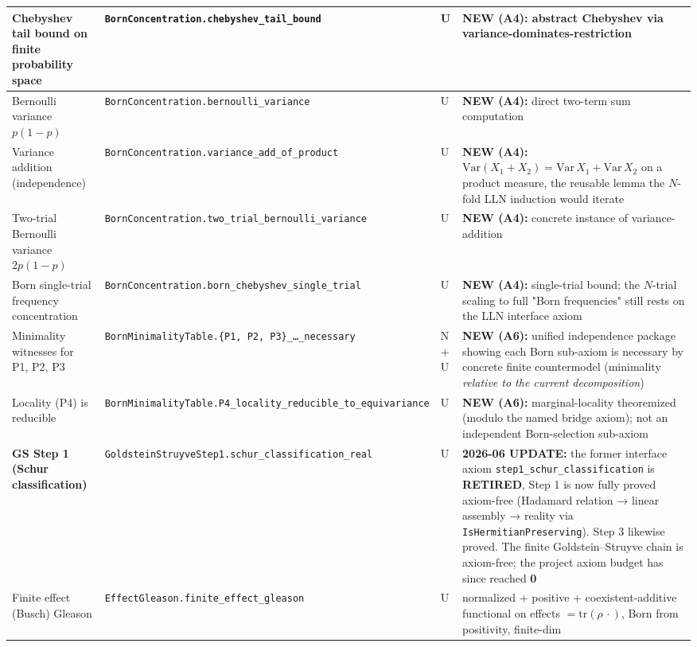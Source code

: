 \documentclass[11pt,a4paper]{article}
\begin{document}
\begin{center}
\begin{tabularx}{\linewidth}{|Y|Y|Y|Y|}
\hline
Chebyshev tail bound on finite probability space & \texttt{BornConcentration.chebyshev\_tail\_bound} & U & \textbf{NEW (A4):} abstract Chebyshev via variance-dominates-restriction \\
\hline
Bernoulli variance $p(1-p)$ & \texttt{BornConcentration.bernoulli\_variance} & U & \textbf{NEW (A4):} direct two-term sum computation \\
\hline
Variance addition (independence) & \texttt{BornConcentration.variance\_add\_of\_product} & U & \textbf{NEW (A4):} $\mathrm{Var}(X_1+X_2)=\mathrm{Var}\,X_1+\mathrm{Var}\,X_2$ on a product measure, the reusable lemma the $N$-fold LLN induction would iterate \\
\hline
Two-trial Bernoulli variance $2p(1-p)$ & \texttt{BornConcentration.two\_trial\_bernoulli\_variance} & U & \textbf{NEW (A4):} concrete instance of variance-addition \\
\hline
Born single-trial frequency concentration & \texttt{BornConcentration.born\_chebyshev\_single\_trial} & U & \textbf{NEW (A4):} single-trial bound; the $N$-trial scaling to full "Born frequencies" still rests on the LLN interface axiom \\
\hline
Minimality witnesses for P1, P2, P3 & \texttt{BornMinimalityTable.\{P1, P2, P3\}\_…\_necessary} & N + U & \textbf{NEW (A6):} unified independence package showing each Born sub-axiom is necessary by concrete finite countermodel (minimality \emph{relative to the current decomposition}) \\
\hline
Locality (P4) is reducible & \texttt{BornMinimalityTable.P4\_locality\_reducible\_to\_equivariance} & U & \textbf{NEW (A6):} marginal-locality theoremized (modulo the named bridge axiom); not an independent Born-selection sub-axiom \\
\hline
\textbf{GS Step 1 (Schur classification)} & \texttt{GoldsteinStruyveStep1.schur\_classification\_real} & U & \textbf{2026-06 UPDATE:} the former interface axiom \texttt{step1\_schur\_classification} is \textbf{RETIRED}, Step 1 is now fully proved axiom-free (Hadamard relation → linear assembly → reality via \texttt{IsHermitianPreserving}). Step 3 likewise proved. The finite Goldstein–Struyve chain is axiom-free; the project axiom budget has since reached \textbf{0} \\
\hline
Finite effect (Busch) Gleason & \texttt{EffectGleason.finite\_effect\_gleason} & U & normalized + positive + coexistent-additive functional on effects $=\mathrm{tr}(\rho\,\cdot)$, Born from positivity, finite-dim \\

\end{tabularx}
\end{center}
\end{document}
